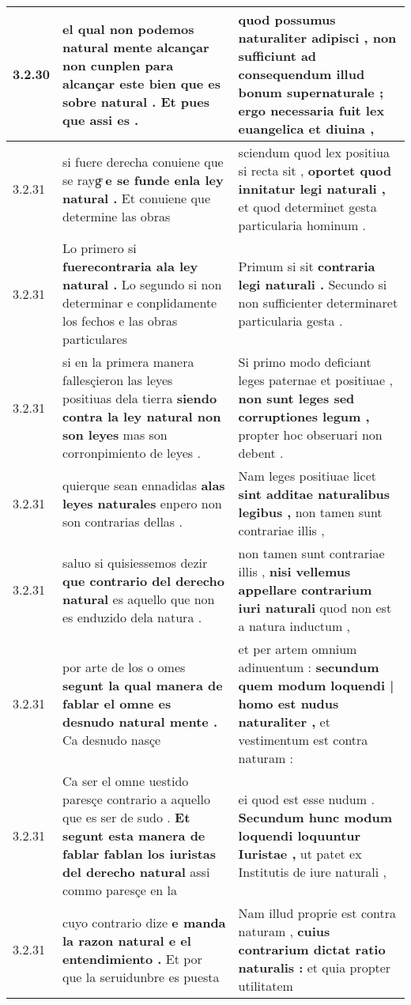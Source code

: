 \begin{tabular}{|p{1cm}|p{6.5cm}|p{6.5cm}|}
3.2.30 & el qual non podemos natural mente alcançar non cunplen para alcançar este bien \textbf{ que es sobre natural . } Et pues que assi es . & quod possumus naturaliter adipisci , \textbf{ non sufficiunt ad consequendum illud bonum supernaturale ; } ergo necessaria fuit lex euangelica et diuina , \\\hline
3.2.31 & si fuere derecha conuiene que se raygͤ \textbf{ e se funde enla ley natural . } Et conuiene que determine las obras & sciendum quod lex positiua si recta sit , \textbf{ oportet quod innitatur legi naturali , } et quod determinet gesta particularia hominum . \\\hline
3.2.31 & Lo primero si \textbf{ fuerecontraria ala ley natural . } Lo segundo si non determinar e conplidamente los fechos e las obras particulares & Primum si sit \textbf{ contraria legi naturali . } Secundo si non sufficienter determinaret particularia gesta . \\\hline
3.2.31 & si en la primera manera fallesçieron las leyes positiuas dela tierra \textbf{ siendo contra la ley natural non son leyes } mas son corronpimiento de leyes . & Si primo modo deficiant leges paternae et positiuae , \textbf{ non sunt leges sed corruptiones legum , } propter hoc obseruari non debent . \\\hline
3.2.31 & quierque sean ennadidas \textbf{ alas leyes naturales } enpero non son contrarias dellas . & Nam leges positiuae licet \textbf{ sint additae naturalibus legibus , } non tamen sunt contrariae illis , \\\hline
3.2.31 & saluo si quisiessemos dezir \textbf{ que contrario del derecho natural } es aquello que non es enduzido dela natura . & non tamen sunt contrariae illis , \textbf{ nisi vellemus appellare contrarium iuri naturali } quod non est a natura inductum , \\\hline
3.2.31 & por arte de los o omes \textbf{ segunt la qual manera de fablar el omne es desnudo natural mente . } Ca desnudo nasçe & et per artem omnium adinuentum : \textbf{ secundum quem modum loquendi | homo est nudus naturaliter , } et vestimentum est contra naturam : \\\hline
3.2.31 & Ca ser el omne uestido paresçe contrario a aquello que es ser de sudo . \textbf{ Et segunt esta manera de fablar fablan los iuristas del derecho natural } assi commo paresçe en la & ei quod est esse nudum . \textbf{ Secundum hunc modum loquendi loquuntur Iuristae , } ut patet ex Institutis de iure naturali , \\\hline
3.2.31 & cuyo contrario dize \textbf{ e manda la razon natural e el entendimiento . } Et por que la seruidunbre es puesta & Nam illud proprie est contra naturam , \textbf{ cuius contrarium dictat ratio naturalis : } et quia propter utilitatem \\\hline

\end{tabular}

